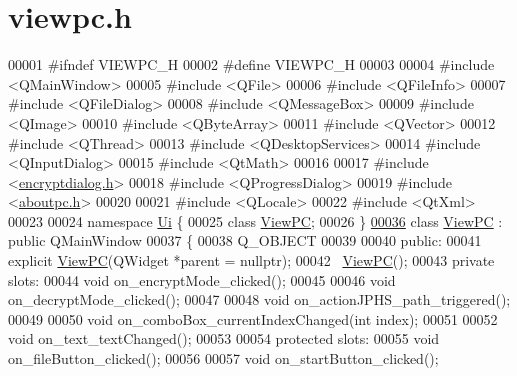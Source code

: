 \hypertarget{viewpc_8h_source}{}\section{viewpc.\+h}

\begin{DoxyCode}
00001 \textcolor{preprocessor}{#ifndef VIEWPC\_H}
00002 \textcolor{preprocessor}{#define VIEWPC\_H}
00003 
00004 \textcolor{preprocessor}{#include <QMainWindow>}
00005 \textcolor{preprocessor}{#include <QFile>}
00006 \textcolor{preprocessor}{#include <QFileInfo>}
00007 \textcolor{preprocessor}{#include <QFileDialog>}
00008 \textcolor{preprocessor}{#include <QMessageBox>}
00009 \textcolor{preprocessor}{#include <QImage>}
00010 \textcolor{preprocessor}{#include <QByteArray>}
00011 \textcolor{preprocessor}{#include <QVector>}
00012 \textcolor{preprocessor}{#include <QThread>}
00013 \textcolor{preprocessor}{#include <QDesktopServices>}
00014 \textcolor{preprocessor}{#include <QInputDialog>}
00015 \textcolor{preprocessor}{#include <QtMath>}
00016 
00017 \textcolor{preprocessor}{#include <\hyperlink{encryptdialog_8h}{encryptdialog.h}>}
00018 \textcolor{preprocessor}{#include <QProgressDialog>}
00019 \textcolor{preprocessor}{#include <\hyperlink{aboutpc_8h}{aboutpc.h}>}
00020 
00021 \textcolor{preprocessor}{#include <QLocale>}
00022 \textcolor{preprocessor}{#include <QtXml>}
00023 
00024 \textcolor{keyword}{namespace }\hyperlink{namespace_ui}{Ui} \{
00025 \textcolor{keyword}{class }\hyperlink{class_view_p_c}{ViewPC};
00026 \}
\hypertarget{viewpc_8h_source.tex_l00036}{}\hyperlink{class_view_p_c}{00036} \textcolor{keyword}{class }\hyperlink{class_view_p_c}{ViewPC} : \textcolor{keyword}{public} QMainWindow
00037 \{
00038     Q\_OBJECT
00039 
00040 \textcolor{keyword}{public}:
00041     \textcolor{keyword}{explicit} \hyperlink{class_view_p_c}{ViewPC}(QWidget *parent = \textcolor{keyword}{nullptr});
00042     ~\hyperlink{class_view_p_c}{ViewPC}();
00043 \textcolor{keyword}{private} slots:
00044     \textcolor{keywordtype}{void} on\_encryptMode\_clicked();
00045 
00046     \textcolor{keywordtype}{void} on\_decryptMode\_clicked();
00047 
00048     \textcolor{keywordtype}{void} on\_actionJPHS\_path\_triggered();
00049 
00050     \textcolor{keywordtype}{void} on\_comboBox\_currentIndexChanged(\textcolor{keywordtype}{int} index);
00051 
00052     \textcolor{keywordtype}{void} on\_text\_textChanged();
00053 
00054 \textcolor{keyword}{protected} slots:
00055     \textcolor{keywordtype}{void} on\_fileButton\_clicked();
00056 
00057     \textcolor{keywordtype}{void} on\_startButton\_clicked();

\end{DoxyCode}
